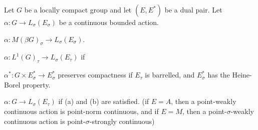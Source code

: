 \documentclass{../../large}
\begin{document}
\begin{prb}
Let $G$ be a locally compact group and let $(E,E^*)$ be a dual pair.
Let $\alpha:G\to L_\sigma(E_\sigma)$ be a continuous bounded action.
\begin{parts}
\item $\alpha:M(\beta G)_\sigma\to L_\sigma(E_\sigma)$.
\item $\alpha:L^1(G)_\tau\to L_\sigma(E_\tau)$ if
\item $\alpha^*:G\times E_\sigma^*\to E_\sigma^*$ preserves compactness if $E_\tau$ is barrelled, and $E_\sigma^*$ has the Heine-Borel property.
\item $\alpha:G\to L_\sigma(E_\tau)$ if (a) and (b) are satisfied. (if $E=A$, then a point-weakly continuous action is point-norm continuous, and if $E=M$, then a point-$\sigma$-weakly continuous action is point-$\sigma$-strongly continuous)
\end{parts}
\end{prb}
\end{document}
